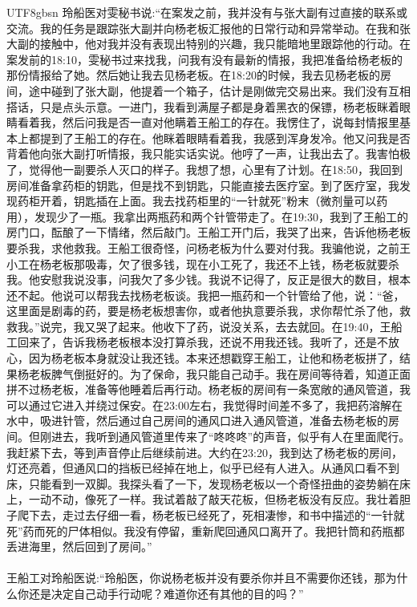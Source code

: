 \documentclass[11pt]{article}
\begin{document}
{\begin{CJK}{UTF8}{gbsn}
玲船医对雯秘书说:``在案发之前，我并没有与张大副有过直接的联系或交流。我的任务是跟踪张大副并向杨老板汇报他的日常行动和异常举动。在我和张大副的接触中，他对我并没有表现出特别的兴趣，我只能暗地里跟踪他的行动。在案发前的18:10，雯秘书过来找我，问我有没有最新的情报，我把准备给杨老板的那份情报给了她。然后她让我去见杨老板。在18:20的时候，我去见杨老板的房间，途中碰到了张大副，他提着一个箱子，估计是刚做完交易出来。我们没有互相搭话，只是点头示意。一进门，我看到满屋子都是身着黑衣的保镖，杨老板眯着眼睛看着我，然后问我是否一直对他瞒着王船工的存在。我愣住了，说每封情报里基本上都提到了王船工的存在。他眯着眼睛看着我，我感到浑身发冷。他又问我是否背着他向张大副打听情报，我只能实话实说。他哼了一声，让我出去了。我害怕极了，觉得他一副要杀人灭口的样子。我想了想，心里有了计划。在18:50，我回到房间准备拿药柜的钥匙，但是找不到钥匙，只能直接去医疗室。到了医疗室，我发现药柜开着，钥匙插在上面。我去找药柜里的“一针就死”粉末（微剂量可以药用），发现少了一瓶。我拿出两瓶药和两个针管带走了。在19:30，我到了王船工的房门口，酝酿了一下情绪，然后敲门。王船工开门后，我哭了出来，告诉他杨老板要杀我，求他救我。王船工很奇怪，问杨老板为什么要对付我。我骗他说，之前王小工在杨老板那吸毒，欠了很多钱，现在小工死了，我还不上钱，杨老板就要杀我。他安慰我说没事，问我欠了多少钱。我说不记得了，反正是很大的数目，根本还不起。他说可以帮我去找杨老板谈。我把一瓶药和一个针管给了他，说：“爸，这里面是剧毒的药，要是杨老板想害你，或者他执意要杀我，求你帮忙杀了他，救救我。”说完，我又哭了起来。他收下了药，说没关系，去去就回。在19:40，王船工回来了，告诉我杨老板根本没打算杀我，还说不用我还钱。我听了，还是不放心，因为杨老板本身就没让我还钱。本来还想戳穿王船工，让他和杨老板拼了，结果杨老板脾气倒挺好的。为了保命，我只能自己动手。我在房间等待着，知道正面拼不过杨老板，准备等他睡着后再行动。杨老板的房间有一条宽敞的通风管道，我可以通过它进入并绕过保安。在23:00左右，我觉得时间差不多了，我把药溶解在水中，吸进针管，然后通过自己房间的通风口进入通风管道，准备去杨老板的房间。但刚进去，我听到通风管道里传来了“咚咚咚”的声音，似乎有人在里面爬行。我赶紧下去，等到声音停止后继续前进。大约在23:20，我到达了杨老板的房间，灯还亮着，但通风口的挡板已经掉在地上，似乎已经有人进入。从通风口看不到床，只能看到一双脚。我探头看了一下，发现杨老板以一个奇怪扭曲的姿势躺在床上，一动不动，像死了一样。我试着敲了敲天花板，但杨老板没有反应。我壮着胆子爬下去，走过去仔细一看，杨老板已经死了，死相凄惨，和书中描述的“一针就死”药而死的尸体相似。我没有停留，重新爬回通风口离开了。我把针筒和药瓶都丢进海里，然后回到了房间。''\\ \\
王船工对玲船医说:``玲船医，你说杨老板并没有要杀你并且不需要你还钱，那为什么你还是决定自己动手行动呢？难道你还有其他的目的吗？''\\ \\

\end{CJK}}
\end{document}
